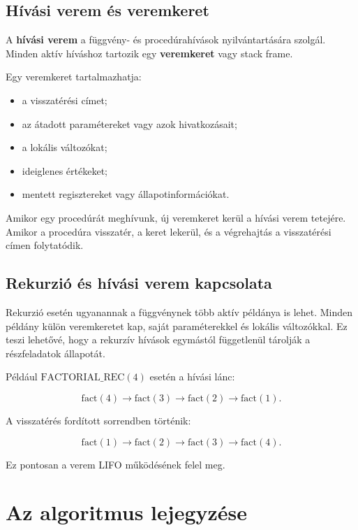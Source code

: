 \subsection{Hívási verem és veremkeret}

A \textbf{hívási verem} a függvény- és procedúrahívások nyilvántartására szolgál. Minden aktív híváshoz tartozik egy \textbf{veremkeret} vagy stack frame.

Egy veremkeret tartalmazhatja:

\begin{itemize}
  \item a visszatérési címet;
  \item az átadott paramétereket vagy azok hivatkozásait;
  \item a lokális változókat;
  \item ideiglenes értékeket;
  \item mentett regisztereket vagy állapotinformációkat.
\end{itemize}

Amikor egy procedúrát meghívunk, új veremkeret kerül a hívási verem tetejére. Amikor a procedúra visszatér, a keret lekerül, és a végrehajtás a visszatérési címen folytatódik.



\subsection{Rekurzió és hívási verem kapcsolata}

Rekurzió esetén ugyanannak a függvénynek több aktív példánya is lehet. Minden példány külön veremkeretet kap, saját paraméterekkel és lokális változókkal. Ez teszi lehetővé, hogy a rekurzív hívások egymástól függetlenül tárolják a részfeladatok állapotát.

Például $\text{FACTORIAL\_REC}(4)$ esetén a hívási lánc:

\[
\text{fact}(4)\to\text{fact}(3)\to\text{fact}(2)\to\text{fact}(1).
\]

A visszatérés fordított sorrendben történik:

\[
\text{fact}(1)\to\text{fact}(2)\to\text{fact}(3)\to\text{fact}(4).
\]

Ez pontosan a verem LIFO működésének felel meg.

\section{Az algoritmus lejegyzése}

